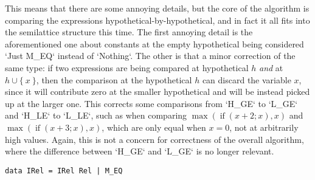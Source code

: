 \documentclass[11pt, twoside, reqno]{book}
\DeclareMathOperator{\imax}{imax}
\DeclareMathOperator{\ifop}{if}
\begin{document}
This means that there are some annoying details, but the core of the algorithm is comparing the expressions hypothetical-by-hypothetical, and in fact it all fits into the semilattice structure this time.
The first annoying detail is the aforementioned one about constants at the empty hypothetical being considered \inHS`Just M_EQ` instead of \inHS`Nothing`.
The other is that a minor correction of the same type: if two expressions are being compared at hypothetical \(h\) \emph{and} at \(h \cup \{\ x\ \}\), then the comparison at the hypothetical \(h\) can discard the variable \(x\), since it will contribute zero at the smaller hypothetical and will be instead picked up at the larger one.
This corrects some comparisons from \inHS`H_GE` to \inHS`L_GE` and \inHS`H_LE` to \inHS`L_LE`, such as when comparing \(\max(\ifop(x+2; x), x)\) and \(\max(\ifop(x+3; x), x)\), which are only equal when \(x = 0\), not at arbitrarily high values.
Again, this is not a concern for correctness of the overall algorithm, where the difference between \inHS`H_GE` and \inHS`L_GE` is no longer relevant.


\begin{verbatim}
data IRel = IRel Rel | M_EQ
\end{verbatim}
\end{document}
